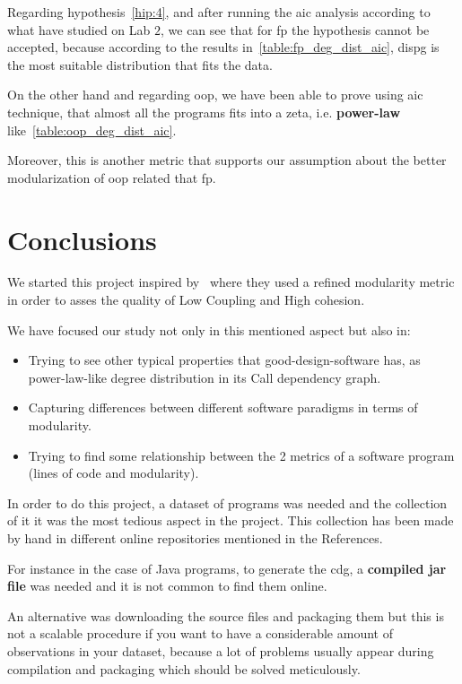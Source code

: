 \documentclass[12pt, a4paper]{article}
\begin{document}
Regarding hypothesis~\ref{hip:4}, and after running the \acrlong{aic} analysis according to what have studied on Lab $2$, we can see that for \acrlong{fp} the hypothesis cannot be accepted,
because according to the results in~\ref{table:fp_deg_dist_aic}, \acrlong{dispg} is the most suitable distribution that fits the data.

On the other hand and regarding \acrlong{oop}, we have been able to prove using \acrlong{aic} technique, that almost all the programs fits into a \acrlong{zeta}, i.e. \textbf{power-law} like~\ref{table:oop_deg_dist_aic}.

Moreover, this is another metric that supports our assumption about the better modularization of \acrlong{oop} related that \acrlong{fp}.

\section{Conclusions}

We started this project inspired by~\cite{cohesion_coupling} where they used a refined modularity metric in order to asses the quality of Low Coupling and High cohesion.

We have focused our study not only in this mentioned aspect but also in:

\begin{itemize}
  \item Trying to see other typical properties that good-design-software has, as power-law-like degree distribution in its Call dependency graph.
  \item Capturing differences between different software paradigms in terms of modularity.
  \item Trying to find some relationship between the 2 metrics of a software program (lines of code and modularity).
\end{itemize}

In order to do this project, a dataset of programs was needed and the collection of it it was the most tedious aspect in the project. This collection has been made by hand in different online repositories mentioned in the References.

For instance in the case of Java programs, to generate the \acrlong{cdg}, a \textbf{compiled jar file} was needed and it is not common to find them online.

An alternative was downloading the source files and packaging them but this is not a scalable procedure if you want to have a considerable amount of observations in your dataset, because a lot of problems usually appear during compilation and packaging which should be solved meticulously. 
\end{document}
